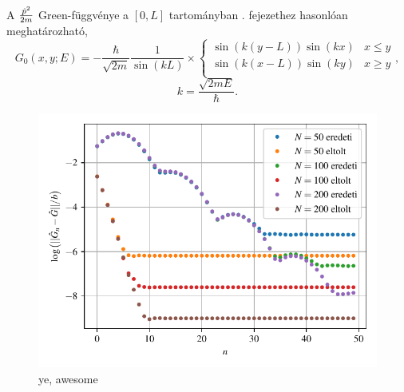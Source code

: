 A $\frac{\hat{p}^2}{2m}$ Green-függvénye a $[0,L]$ tartományban . fejezethez hasonlóan meghatározható,
\begin{equation}
	G_0\left(x,y;E\right) = -\frac{\hbar}{\sqrt{2m}}\frac{1}{\sin\left(kL\right)}\times
	\begin{cases}
		\sin\left(k\left(y-L\right)\right)\sin\left(kx\right) & x\leq y\\
		\sin\left(k\left(x-L\right)\right)\sin\left(ky\right) & x\geq y\\
	\end{cases},
\end{equation}
\begin{equation}
	k = \frac{\sqrt{2mE}}{\hbar}.
\end{equation}

\begin{figure}[H]
	\centering
	\includegraphics[scale=1]{./figs/convergencerate.pdf}
	\caption[A Green-függvény perturbációs sorának konvergencia sebessége]{ye, awesome}
\end{figure}
